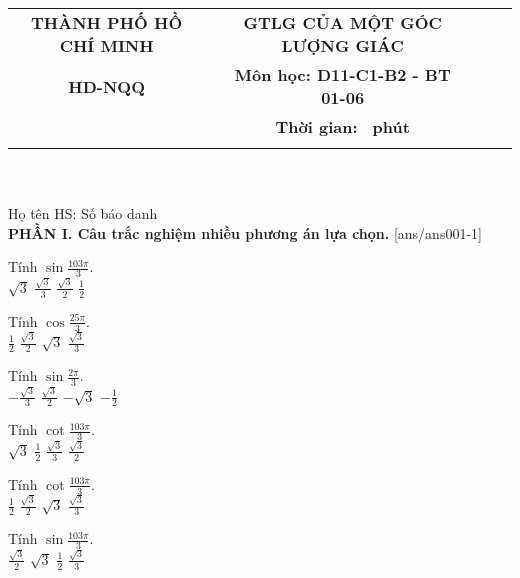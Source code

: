 \documentclass[12pt,a4paper]{article}
\newcommand{\tenso}{THÀNH PHỐ HỒ CHÍ MINH}
\newcommand{\tentruong}{HD-NQQ}
\newcommand{\tenkythi}{GTLG CỦA MỘT GÓC LƯỢNG GIÁC}
\newcommand{\tenmonthi}{Môn học: D11-C1-B2 - BT 01-06}
\newcommand{\thoigian}{}
\newcommand{\tieude}[1]{
   \begin{tabular}{cm{1cm}cm{3cm}cm{3cm}}
    {\bf \tenso} & & {\bf \tenkythi} \\
    {\bf \tentruong} & & {\bf \tenmonthi}\\
    && {\bf Thời gian: \bf \thoigian \, phút}\\
    && { \fbox{\bf Mã đề: #1}}
   \end{tabular}\\\\
    
   {Họ tên HS: \dotfill Số báo danh \dotfill}\\
}
\newcommand{\chantrang}[2]{\rfoot{Trang \thepage $-$ Mã đề #2}}
\begin{document}


\tieude{001}
\setcounter{page}{1}
{\bf PHẦN I. Câu trắc nghiệm nhiều phương án lựa chọn.}
\setcounter{ex}{0}
[ans/ans001-1]
\begin{ex}
 Tính $\sin\frac{103 \pi}{3}$.\\ 
\choice
{ $ \sqrt{3} $ }
   { $ \frac{\sqrt{3}}{3} $ }
     { \True $ \frac{\sqrt{3}}{2} $ }
    { $ \frac{1}{2} $ }
\loigiai{ 
  
 }\end{ex}

\begin{ex}
 Tính $\cos\frac{25 \pi}{3}$.\\ 
\choice
{ \True $ \frac{1}{2} $ }
   { $ \frac{\sqrt{3}}{2} $ }
     { $ \sqrt{3} $ }
    { $ \frac{\sqrt{3}}{3} $ }
\loigiai{ 
  
 }\end{ex}

\begin{ex}
 Tính $\sin\frac{2 \pi}{3}$.\\ 
\choice
{ $ - \frac{\sqrt{3}}{3} $ }
   { \True $ \frac{\sqrt{3}}{2} $ }
     { $ - \sqrt{3} $ }
    { $ - \frac{1}{2} $ }
\loigiai{ 
  
 }\end{ex}

\begin{ex}
 Tính $\cot\frac{103 \pi}{3}$.\\ 
\choice
{ $ \sqrt{3} $ }
   { $ \frac{1}{2} $ }
     { \True $ \frac{\sqrt{3}}{3} $ }
    { $ \frac{\sqrt{3}}{2} $ }
\loigiai{ 
  
 }\end{ex}

\begin{ex}
 Tính $\cot\frac{103 \pi}{3}$.\\ 
\choice
{ $ \frac{1}{2} $ }
   { $ \frac{\sqrt{3}}{2} $ }
     { $ \sqrt{3} $ }
    { \True $ \frac{\sqrt{3}}{3} $ }
\loigiai{ 
  
 }\end{ex}

\begin{ex}
 Tính $\sin\frac{103 \pi}{3}$.\\ 
\choice
{ \True $ \frac{\sqrt{3}}{2} $ }
   { $ \sqrt{3} $ }
     { $ \frac{1}{2} $ }
    { $ \frac{\sqrt{3}}{3} $ }
\loigiai{ 
  
 }\end{ex}
\end{document}
